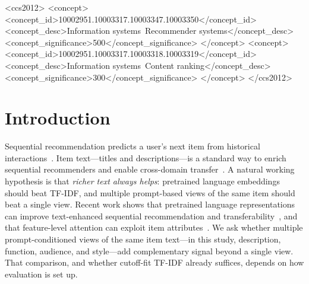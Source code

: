 \documentclass[sigconf,natbib=true,anonymous]{acmart}
\newcommand{\tfidf}{\textsc{TF-IDF}\xspace}
\begin{document}
\begin{CCSXML}
<ccs2012>
 <concept>
  <concept_id>10002951.10003317.10003347.10003350</concept_id>
  <concept_desc>Information systems~Recommender systems</concept_desc>
  <concept_significance>500</concept_significance>
 </concept>
 <concept>
  <concept_id>10002951.10003317.10003318.10003319</concept_id>
  <concept_desc>Information systems~Content ranking</concept_desc>
  <concept_significance>300</concept_significance>
 </concept>
</ccs2012>
\end{CCSXML}


\maketitle

\section{Introduction}
\label{sec:intro}

Sequential recommendation predicts a user's next item from historical interactions~\cite{kang2018sasrec,sun2019bert4rec,hidasi2016gru4rec}.
Item text---titles and descriptions---is a standard way to enrich sequential recommenders and enable cross-domain transfer~\cite{hou2022unisrec,li2023recformer}.
A natural working hypothesis is that \emph{richer text always helps}: pretrained language embeddings should beat \tfidf, and multiple prompt-based views of the same item should beat a single view.
Recent work shows that pretrained language representations can improve text-enhanced sequential recommendation and transferability~\cite{hou2022unisrec,li2023recformer}, and that feature-level attention can exploit item attributes~\cite{zhang2019fdsa}.
We ask whether multiple prompt-conditioned views of the same item text---in this study, description, function, audience, and style---add complementary signal beyond a single view.
That comparison, and whether cutoff-fit \tfidf already suffices, depends on how evaluation is set up.
\end{document}
